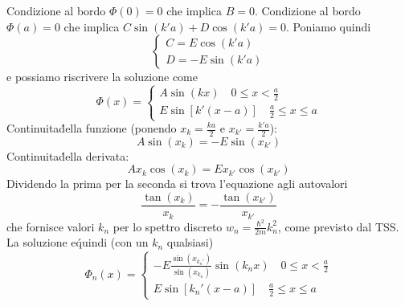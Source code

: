 \documentclass[a4paper]{article}
\begin{document}
        Condizione al bordo $\Phi(0)=0$ che implica $B=0$.
        Condizione al bordo $\Phi(a)=0$ che implica $C\sin(k'a)+D\cos(k'a)=0$.
        Poniamo quindi
        \begin{equation*}
            \begin{cases}
                C=E\cos(k'a)\\
                D=-E\sin(k'a)
            \end{cases}
        \end{equation*}
        e possiamo riscrivere la soluzione come
        \begin{equation*}
            \Phi(x)=
            \begin{cases}
                A\sin(kx)\quad 0\leq x <\frac{a}{2}\\
                E\sin[k'(x-a)]\quad \frac{a}{2}\leq x \leq a
            \end{cases}
        \end{equation*}
        Continuita\' della funzione (ponendo $x_k=\frac{ka}{2}$ e $x_{k'}=\frac{k'a}{2}$):
        \begin{equation*}
            A\sin(x_k)=-E\sin(x_{k'})
        \end{equation*}
        Continuita\' della derivata:
        \begin{equation*}
            Ax_k\cos(x_k)=Ex_{k'}\cos(x_{k'})
        \end{equation*}
        Dividendo la prima per la seconda si trova l'equazione agli autovalori
        \begin{equation*}
            \frac{\tan(x_k)}{x_k}=-\frac{\tan(x_{k'})}{x_{k'}}
        \end{equation*}
        che fornisce valori $k_n$ per lo spettro discreto $w_n=\frac{\hbar^2}{2m}k_n^2$, come previsto dal TSS.
        La soluzione e\' quindi (con un $k_n$ qualsiasi)
        \begin{equation*}
            \Phi_n(x)=
            \begin{cases}
                -E\frac{\sin(x_{k_n'})}{\sin(x_{k_n})}\sin(k_nx)\quad 0\leq x <\frac{a}{2}\\
                E\sin[k_n'(x-a)]\quad \frac{a}{2}\leq x \leq a
            \end{cases}
        \end{equation*}
        \begin{figure}[H]
            \centering
        \end{figure}
\end{document}
